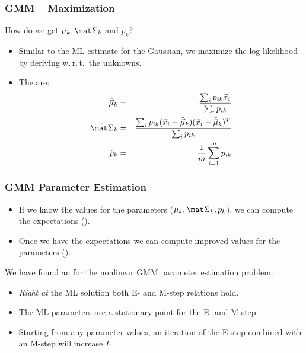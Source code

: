 \begin{frame}
  \frametitle{GMM -- Maximization}
  
   How do we get $\vec \mu_k, \mat \Sigma_k$ and $p_k$? \pause

  \begin{itemize}
    \item Similar to the ML estimate for the Gaussian, we maximize the log-likelihood by deriving w.\,r.\,t.\ the unknowns. \\[.25cm] \pause
    \item The  are:
      \begin{eqnarray*}
        \hat{\vec \mu}_k 
          &=& \frac{\sum_i p_{ik} \vec x_i}{\sum_i p_{ik}} \\
        \hat{\mat \Sigma}_k 
          &=& \frac{\sum_i p_{ik} (\vec x_i - \hat{\vec \mu}_k)(\vec x_i - \hat{\vec \mu}_k)^T}{\sum_i p_{ik}} \\
        \hat{p}_k 
          &=& \frac{1}{m} \sum_{i=1}^m p_{ik}
      \end{eqnarray*}
  \end{itemize}
\end{frame}


\begin{frame}
  \frametitle{GMM Parameter Estimation}


  \begin{itemize}
    \item If we know the values for the parameters ($\vec \mu_k, \mat \Sigma_k, p_k$), we can compute the expectations ().\pause 
    \item Once we have the expectations we can compute improved values for the parameters ().
  \end{itemize}
  \pspread

  We have found an  for the nonlinear GMM parameter estimation problem:

  \begin{itemize}
    \item \emph{Right at} the ML solution both E- and M-step relations hold. \pause 
    \item The ML parameters are a stationary point for the E- and M-step. \pause 
    \item Starting from any parameter values, an iteration of the E-step combined with an M-step will increase $L$
  \end{itemize}
\end{frame}


